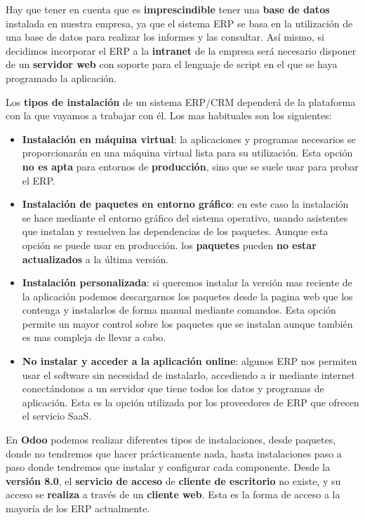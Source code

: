 Hay que tener en cuenta que es \textbf{imprescindible} tener una \textbf{base de datos} instalada en nuestra empresa, ya que el sistema ERP se basa en la utilización de una base de datos para realizar los informes y las consultar. Así mismo, si decidimos incorporar el ERP a la \textbf{intranet} de la empresa será necesario disponer de un \textbf{servidor web} con soporte para el lenguaje de script en el que se haya programado la aplicación.

Los \textbf{tipos de instalación} de un sistema ERP/CRM dependerá de la plataforma con la que vayamos a trabajar con él. Los mas habituales son los siguientes:

\begin{itemize}
    \item \textbf{Instalación en máquina virtual}: la aplicaciones y programas necesarios se proporcionarán en una máquina virtual lista para su utilización. Esta opción \textbf{no es apta} para entornos de \textbf{producción}, sino que se suele usar para probar el ERP.
    \item \textbf{Instalación de paquetes en entorno gráfico}: en este caso la instalación se hace mediante el entorno gráfico del sistema operativo, usando asistentes que instalan y resuelven las dependencias de los paquetes. Aunque esta opción se puede usar en producción. los \textbf{paquetes} pueden \textbf{no estar actualizados} a la última versión.
    \item \textbf{Instalación personalizada}: si queremos instalar la versión mas reciente de la aplicación podemos descargarnos los paquetes desde la pagina web que los contenga y instalarlos de forma manual mediante comandos. Esta opción permite un mayor control sobre los paquetes que se instalan aunque también es mas compleja de llevar a cabo.
    \item \textbf{No instalar y acceder a la aplicación online}: algunos ERP nos permiten usar el software sin necesidad de instalarlo, accediendo a ir mediante internet conectándonos a un servidor que tiene todos los datos y programas de aplicación. Esta es la opción utilizada por los proveedores de ERP que ofrecen el servicio SaaS.
\end{itemize}

En \textbf{Odoo} podemos realizar diferentes tipos de instalaciones, desde paquetes, donde no tendremos que hacer prácticamente nada, hasta instalaciones paso a paso donde tendremos que instalar y configurar cada componente. Desde la \textbf{versión 8.0}, el \textbf{servicio de acceso} de \textbf{cliente de escritorio} no existe, y su acceso se \textbf{realiza} a través de un \textbf{cliente web}. Esta es la forma de acceso a la mayoría de los ERP actualmente.

